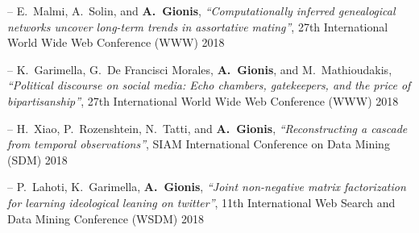 \documentclass[a4paper,11pt]{article}
\begin{document}




\item[--] 
{E.\ Malmi, A.\ Solin, and \textbf{A.\ Gionis}}, 
{\em ``Computationally inferred genealogical networks uncover long-term trends in assortative mating''}, 
27th International World Wide Web Conference (WWW) 2018 

\item[--] 
{K.\ Garimella, G.\ De Francisci Morales, \textbf{A.\ Gionis}, and M.\ Mathioudakis}, 
{\em ``Political discourse on social media: Echo chambers, gatekeepers, and the price of bipartisanship''}, 
27th International World Wide Web Conference (WWW) 2018 

\item[--] 
{H.\ Xiao, P.\ Rozenshtein, N.\ Tatti, and \textbf{A.\ Gionis}}, 
{\em ``Reconstructing a cascade from temporal observations''}, 
SIAM International Conference on Data Mining (SDM) 2018

\item[--] 
{P.\ Lahoti, K.\ Garimella, \textbf{A.\ Gionis}}, 
{\em ``Joint non-negative matrix factorization for learning ideological leaning on twitter''}, 
11th International Web Search and Data Mining Conference (WSDM) 2018
\end{document}
